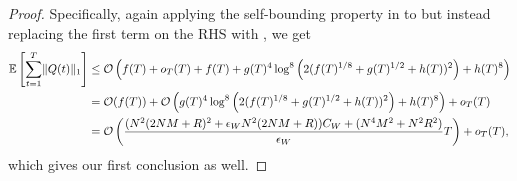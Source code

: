 \documentclass[11pt,fullpage,letterpaper]{article} %
\renewcommand{\bm}[1]{#1}%
\renewcommand{\O}{\operatorname{\mathcal O}}
\newcommand{\E}{\operatornamewithlimits{\mathbb{E}}}
\begin{document}
\begin{proof}
Specifically, again applying the self-bounding property in  to  but instead replacing the first term on the RHS with , we get
\begin{align*}
\E\left [\sum_{t=1}^T \lVert \bm Q(t)\rVert_1\right ]&\le \O\left (f(T) + o_T(T) + f(T) + g(T)^4 \log^8\left (2(f(T)^{1/8}+g(T)^{1/2}+h(T))^2\right ) + h(T)^8\right )\\
&=\O(f(T)) + \O\left (g(T)^4 \log^8\left (2(f(T)^{1/8}+g(T)^{1/2}+h(T))^2\right ) + h(T)^8\right ) + o_T(T) \\
&=\O\left (\frac{(N^2 (2NM+R)^2 + \epsilon_W N^2 (2NM+R)) C_W + (N^4 M^2+N^2 R^2)}{\epsilon_W} T\right ) + o_T(T),
\end{align*}
which gives our first conclusion as well.
\end{proof}
\end{document}
